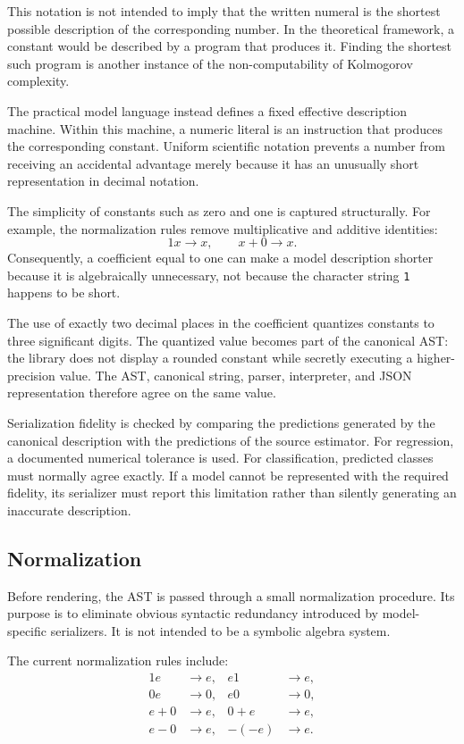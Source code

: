 This notation is not intended to imply that the written numeral is the shortest
possible description of the corresponding number. In the theoretical framework,
a constant would be described by a program that produces it. Finding the
shortest such program is another instance of the non-computability of
Kolmogorov complexity.

The practical model language instead defines a fixed effective description
machine. Within this machine, a numeric literal is an instruction that produces
the corresponding constant. Uniform scientific notation prevents a number from
receiving an accidental advantage merely because it has an unusually short
representation in decimal notation.

The simplicity of constants such as zero and one is captured structurally. For
example, the normalization rules remove multiplicative and additive identities:
\[
1x\longrightarrow x,
\qquad
x+0\longrightarrow x.
\]
Consequently, a coefficient equal to one can make a model description shorter
because it is algebraically unnecessary, not because the character string
\texttt{1} happens to be short.

The use of exactly two decimal places in the coefficient quantizes constants to
three significant digits. The quantized value becomes part of the canonical AST:
the library does not display a rounded constant while secretly executing a
higher-precision value. The AST, canonical string, parser, interpreter, and
JSON representation therefore agree on the same value.

Serialization fidelity is checked by comparing the predictions generated by
the canonical description with the predictions of the source estimator. For
regression, a documented numerical tolerance is used. For classification,
predicted classes must normally agree exactly. If a model cannot be represented
with the required fidelity, its serializer must report this limitation rather
than silently generating an inaccurate description.

\subsection{Normalization}

Before rendering, the AST is passed through a small normalization procedure.
Its purpose is to eliminate obvious syntactic redundancy introduced by
model-specific serializers. It is not intended to be a symbolic algebra
system.

The current normalization rules include:
\[
\begin{aligned}
1e &\longrightarrow e,
&
e1 &\longrightarrow e,
\\
0e &\longrightarrow 0,
&
e0 &\longrightarrow 0,
\\
e+0 &\longrightarrow e,
&
0+e &\longrightarrow e,
\\
e-0 &\longrightarrow e,
&
-(-e) &\longrightarrow e.
\end{aligned}
\]

